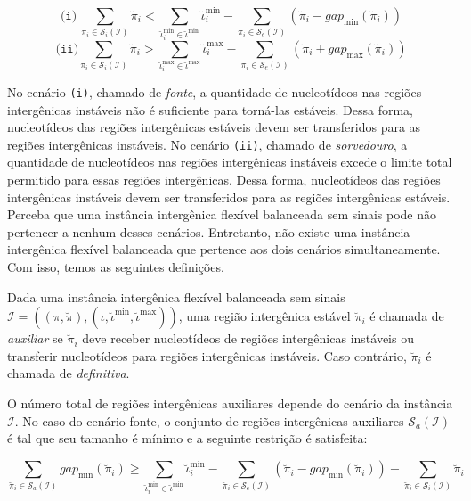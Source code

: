 $$\texttt{(i)}~\sum_{\breve\pi_i \in \mathcal{S}_{i}(\mathcal{I})} \breve\pi_i < \sum_{\breve\iota_{i}^{\min}  \in \breve\iota^{\min}} \breve\iota_{i}^{\min} - \sum_{\breve\pi_i \in \mathcal{S}_{e}(\mathcal{I})} (\breve\pi_i - gap_{\min}(\breve\pi_i))$$
$$\texttt{(ii)}\sum_{\breve\pi_i \in \mathcal{S}_{i}(\mathcal{I})} \breve\pi_i > \sum_{\breve\iota_{i}^{\max}  \in \breve\iota^{\max}} \breve\iota_{i}^{\max} - \sum_{\breve\pi_i \in \mathcal{S}_{e}(\mathcal{I})} (\breve\pi_i + gap_{\max}(\breve\pi_i))$$

No cenário \texttt{(i)}, chamado de \emph{fonte}, a quantidade de nucleotídeos nas regiões intergênicas instáveis não é suficiente para torná-las estáveis. Dessa forma, nucleotídeos das regiões intergênicas estáveis devem ser transferidos para as regiões intergênicas instáveis. No cenário \texttt{(ii)}, chamado de \emph{sorvedouro}, a quantidade de nucleotídeos nas regiões intergênicas instáveis excede o limite total permitido para essas regiões intergênicas. Dessa forma, nucleotídeos das regiões intergênicas instáveis devem ser transferidos para as regiões intergênicas estáveis. Perceba que uma instância intergênica flexível balanceada sem sinais pode não pertencer a nenhum desses cenários. Entretanto, não existe uma instância intergênica flexível balanceada que pertence aos dois cenários simultaneamente. Com isso, temos as seguintes definições.

\begin{definition}
  Dada uma instância intergênica flexível balanceada sem sinais $\mathcal{I} = ((\pi,\breve\pi),(\iota,\breve\iota^{\min},\breve\iota^{\max}))$, uma região intergênica estável $\breve\pi_i$ é chamada de \emph{auxiliar} se $\breve\pi_i$ deve receber nucleotídeos de regiões intergênicas instáveis ou transferir nucleotídeos para regiões intergênicas instáveis. Caso contrário, $\breve\pi_i$ é chamada de \emph{definitiva}.
\end{definition}

O número total de regiões intergênicas auxiliares depende do cenário da instância $\mathcal{I}$. No caso do cenário fonte, o conjunto de regiões intergênicas auxiliares $\mathcal{S}_{a}(\mathcal{I})$ é tal que seu tamanho é mínimo e a seguinte restrição é satisfeita:

$$\sum_{\breve\pi_i \in \mathcal{S}_{a}(\mathcal{I})} gap_{\min}(\breve\pi_i) \ge \sum_{\breve\iota_{i}^{\min}  \in \breve\iota^{\min}} \breve\iota_{i}^{\min} - \sum_{\breve\pi_i \in \mathcal{S}_{e}(\mathcal{I})} (\breve\pi_i - gap_{\min}(\breve\pi_i)) - \sum_{\breve\pi_i \in \mathcal{S}_{i}(\mathcal{I})} \breve\pi_i$$

